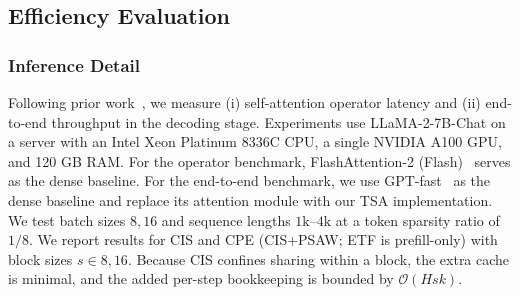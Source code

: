 





\subsection{Efficiency Evaluation}

\subsubsection{Inference Detail}

Following prior work~\cite{yang2024post,wuhshare}, we measure (i) self-attention operator latency and (ii) end-to-end throughput in the decoding stage. Experiments use \mbox{LLaMA-2-7B-Chat} on a server with an Intel Xeon Platinum 8336C CPU, a single NVIDIA A100 GPU, and 120 GB RAM. For the operator benchmark, FlashAttention-2 (Flash)~\cite{dao2022flashattention} serves as the dense baseline. For the end-to-end benchmark, we use GPT-fast~\cite{pytorch} as the dense baseline and replace its attention module with our TSA implementation. We test batch sizes ${8,16}$ and sequence lengths $1\text{k}$–$4\text{k}$ at a token sparsity ratio of $1/8$. We report results for CIS and CPE (CIS+PSAW; ETF is prefill-only) with block sizes $s\in{8,16}$. Because CIS confines sharing within a block, the extra cache is minimal, and the added per-step bookkeeping is bounded by $\mathcal{O}(H s k)$.


